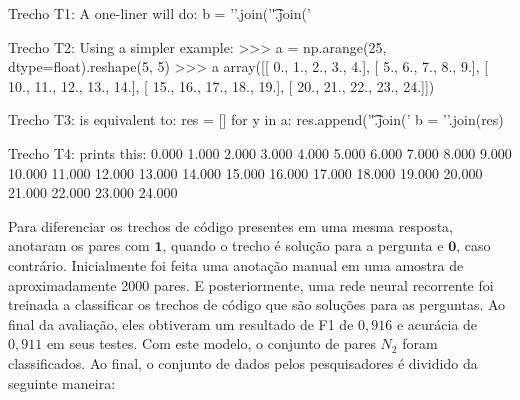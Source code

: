 \begin{tcolorbox}[colframe=orange!75!black,colback=gray!15!white,fonttitle=\bfseries,adjusted title=\large{Título da questão: convert 2d numpy array to string}~\ref{foot:exemplo-stackoverflow-mais-de-um-trecho}]
\begin{mypythongreen}{Trecho T1: A one-liner will do:}
b = '\n'.join('\t'.join('%
\end{mypythongreen}

\begin{mypythonred}{Trecho T2: Using a simpler example:}
>>> a = np.arange(25, dtype=float).reshape(5, 5)
>>> a
array([[  0.,   1.,   2.,   3.,   4.],
       [  5.,   6.,   7.,   8.,   9.],
       [ 10.,  11.,  12.,  13.,  14.],
       [ 15.,  16.,  17.,  18.,  19.],
       [ 20.,  21.,  22.,  23.,  24.]])
\end{mypythonred}
\begin{mypythongreen}{Trecho T3: is equivalent to:}
res = []
for y in a:
    res.append('\t'.join('%
b = '\n'.join(res)
\end{mypythongreen}
\begin{mypythonred}{Trecho T4: prints this:}
0.000   1.000   2.000   3.000   4.000
5.000   6.000   7.000   8.000   9.000
10.000  11.000  12.000  13.000  14.000
15.000  16.000  17.000  18.000  19.000
20.000  21.000  22.000  23.000  24.000
\end{mypythonred}
\end{tcolorbox}


Para diferenciar os trechos de código presentes em uma mesma resposta, \cite{yao-2018} anotaram os pares com $\bm{1}$, quando o trecho é solução para a pergunta e $\bm{0}$, caso contrário. Inicialmente foi feita uma anotação manual em uma amostra de aproximadamente 2000 pares. E posteriormente, uma rede neural recorrente foi treinada a classificar os trechos de código que são soluções para as perguntas. Ao final da avaliação, eles obtiveram um resultado de F1 de $0,916$ e acurácia de $0,911$ em seus testes. Com este modelo, o conjunto de pares $N_{2}$ foram classificados. Ao final, o conjunto de dados pelos pesquisadores é dividido da seguinte maneira:

